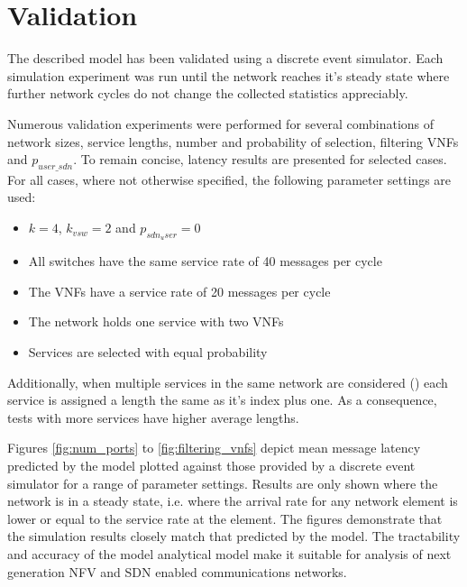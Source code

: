 
\section{Validation}
\label{sec:validation}
The described model has been validated using a discrete event simulator. Each simulation experiment was run until the network reaches it's steady state where further network cycles do not change the collected statistics appreciably. 

Numerous validation experiments were performed for several combinations of network sizes, service lengths, number and probability of selection, filtering VNFs and $p_{user\_sdn}$. To remain concise, latency results are presented for selected cases. For all cases, where not otherwise specified, the following parameter settings are used:

\begin{itemize}
\item $k = 4$, $k_{vsw} = 2$ and $p_{sdn_user} = 0$
\item All switches have the same service rate of 40 messages per cycle
\item The VNFs have a service rate of 20 messages per cycle
\item The network holds one service with two VNFs
\item Services are selected with equal probability
\end{itemize}

Additionally, when multiple services in the same network are considered () each service is assigned a length the same as it's index plus one. As a consequence, tests with more services have higher average lengths.

Figures \ref{fig:num_ports} to \ref{fig:filtering_vnfs} depict mean message latency predicted by the model plotted against those provided by a discrete event simulator for a range of parameter settings. Results are only shown where the network is in a steady state, i.e. where the arrival rate for any network element is lower or equal to the service rate at the element. The figures demonstrate that the simulation results closely match that predicted by the model. The tractability and accuracy of the model analytical model make it suitable for analysis of next generation NFV and SDN enabled communications networks.


